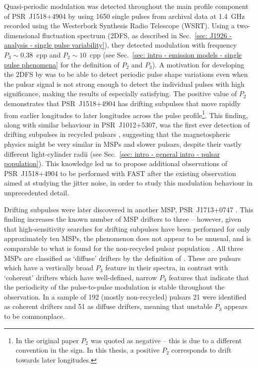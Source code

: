 Quasi-periodic modulation was detected throughout the main profile component of PSR~J1518+4904 by \citet{ESxx2003} using 1650 single pulses from archival data at 1.4~GHz recorded using the Westerbork Synthesis Radio Telescope (WSRT). Using a two-dimensional fluctuation spectrum (2DFS, as described in Sec.~\ref{sec: J1926 - analysis - single pulse variability}), they detected modulation with frequency $P_3\sim0.38$~cpp and $P_2\sim 10$~cpp (see Sec.~\ref{sec: intro - emission models - single pulse phenomena} for the definition of $P_2$ and $P_3$). 
A motivation for developing the 2DFS by \citet{ESxx2002} was to be able to detect periodic pulse shape variations even when the pulsar signal is not strong enough to detect the individual pulses with high significance, making the results of \citet{ESxx2003} especially satisfying. The positive value of $P_2$ demonstrates that PSR~J1518+4904 has drifting subpulses that move rapidly from earlier longitudes to later longitudes across the pulse profile\footnote{In the original paper $P_2$ was quoted as negative -- this is due to a different convention in the sign. In this thesis, a positive $P_2$ corresponds to drift towards later longitudes.}. This finding, along with similar behaviour in PSR~J1012+5307, was the first ever detection of drifting subpulses in recycled pulsars \citep{ESxx2003}, suggesting that the magnetospheric physics might be very similar in MSPs and slower pulsars, despite their vastly different light-cylinder radii (see Sec.~\ref{sec: intro - general intro - pulsar population}). This knowledge led us to propose additional observations of PSR~J1518+4904 to be performed with FAST after the existing observation aimed at studying the jitter noise, in order to study this modulation behaviour in unprecedented detail.

Drifting subpulses were later discovered in another MSP, PSR~J1713+0747 \citep{LBJ+2016}. This finding increases the known number of MSP drifters to three -- however, given that high-sensitivity searches for drifting subpulses have been performed for only approximately ten MSPs, the phenomenon does not appear to be unusual, and is comparable to what is found for the non-recycled pulsar population \citep[more than 55~per~cent;][]{WESx2007}. All three MSPs are classified as `diffuse' drifters by the definition of \citet{WESx2006}. These are pulsars which have a vertically broad $P_3$ feature in their spectra, in contrast with `coherent' drifters which have well-defined, narrow $P_3$ features that indicate that the periodicity of the pulse-to-pulse modulation is stable throughout the observation. In a sample of 192 (mostly non-recycled) pulsars \citep[Table 2]{WESx2006} 21 were identified as coherent drifters and 51 as diffuse drifters, meaning that unstable $P_3$ appears to be commonplace. 

